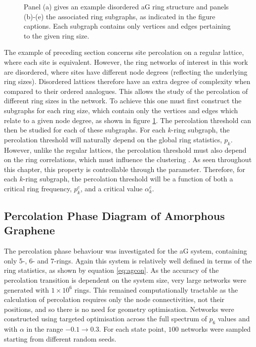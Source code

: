 \begin{figure}[bt]
     \caption{Panel (a) gives an example disordered aG ring structure and panels (b)\--(e) the associated ring subgraphs, as indicated in the figure captions. Each subgraph contains only vertices and edges pertaining to the given ring size.}
     \label{fig:subgraphs}
\end{figure}

The example of preceding section concerns site percolation on a regular lattice, where each site is equivalent.
However, the ring networks of interest in this work are disordered, where sites have different node degrees (reflecting the underlying ring sizes).
Disordered lattices therefore have an extra degree of complexity when compared to their ordered analogues.
This allows the study of the percolation of different ring sizes in the network.
To achieve this one must first construct the subgraphs for each ring size, which contain only the vertices and edges which relate to a given node degree, as shown  in figure \ref{fig:subgraphs}.
The percolation threshold can then be studied for each of these subgraphs.
For each $k$\--ring subgraph, the percolation threshold will naturally depend on the global ring statistics, $p_k$.
However, unlike the regular lattices, the percolation threshold must also depend on the ring correlations, which must influence the clustering \cite{Newman2003}.
As seen throughout this chapter, this property is controllable through the \aw{} parameter.
Therefore, for each $k$\--ring subgraph, the percolation threshold will be a function of both a critical ring frequency, $p_k^c$, and a critical \aw{} value $\alpha_k^c$.

\subsection{Percolation Phase Diagram of Amorphous Graphene}
\label{s:percphasediagram}

The percolation phase behaviour was investigated for the aG system, containing only 5\--, 6\-- and 7\--rings.
Again this system is relatively well defined in terms of the ring statistics, as shown by equation \ref{eq:agcon}.
As the accuracy of the percolation transition is dependent on the system size, very large networks were generated with $1\times10^6$ rings.
This remained computationally tractable as the calculation of percolation requires only the node connectivities, not their positions, and so there is no need for geometry optimisation.
Networks were constructed using targeted optimisation across the full spectrum of $p_6$ values and with $\alpha$ in the range $-0.1\rightarrow 0.3$.
For each state point, $100$ networks were sampled starting from different random seeds. 

